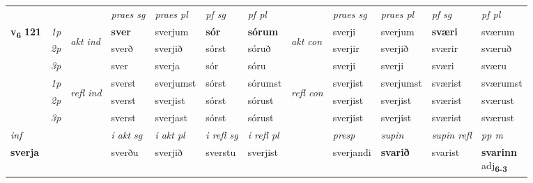 \begin{longtable}[l]{X>{\footnotesize\itshape}llXXXXlXXXX}
 & &   & \textit{praes sg}  & \textit{praes pl}    & \textit{ pf sg} & \textit{pf pl} & & \textit{praes sg}  & \textit{praes pl}    & \textit{pf sg} & \textit{pf pl }  \\ \cmidrule{4-7} \cmidrule{9-12}
 \multirow{2}{*}{{{\textbf{v{\textsubscript{6}}} \Large{\textbf{121}}}}}  & 1p & \multirow{3}{*}{\begin{turn}{90}\textit{akt ind}\end{turn}} & \textbf{sver} & sverjum & \textbf{sór} & \textbf{sórum} & \multirow{3}{*}{\begin{turn}{90}\textit{akt con}\end{turn}} &sverji & sverjum & \textbf{sværi} & sværum\\*
 & 2p &  &  sverð  & sverjið & sórst & sóruð & & sverjir & sverjið & sværir & sværuð \\*
 & 3p &  & sver & sverja & sór & sóru & & sverji & sverji& sværi & sværu \\*
\cmidrule{4-7} \cmidrule{9-12}
 & 1p & \multirow{3}{*}{\begin{turn}{90}\textit{refl ind}\end{turn}}  & sverst & sverjumst & sórst & sórumst & \multirow{3}{*}{\begin{turn}{90}\textit{refl con}\end{turn}}  &sverjist & sverjumst & sværist & sværumst \\*
 & 2p &  & sverst & sverjist & sórst & sórust & &sverjist & sverjist & sværist & sværust \\*
 & 3p  & & sverst & sverjast & sórst & sórust & & sverjist & sverjist& sværist & sværust \\*
\cmidrule{4-7} \cmidrule{9-12}

   {\textit{inf}} & &  & \textit{i akt sg} & \textit{i akt pl} & \textit{i refl sg} & \textit{i refl pl} && \textit{presp} & \textit{supin} & \textit{supin refl} & \textit{pp m} \\*
  {\textbf{sverja}} & && sverðu  & sverjið & sverstu & sverjist && sverjandi &  \textbf{svarið} & svarist & \specialcell{\textbf{svarinn} \\ adj\textbf{\textsubscript{6-3}}} \\*

\midrule


\end{longtable}
